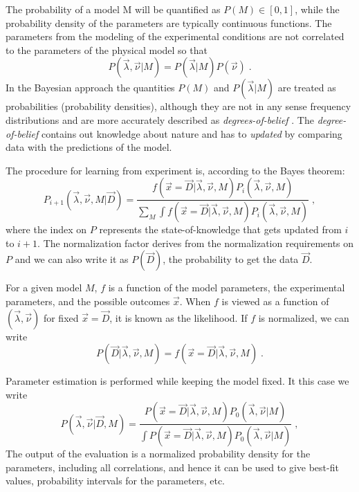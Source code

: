  The probability of a model M will be quantified as $P(M)\in[0,1]$, while the probability density of the parameters are typically continuous functions. The parameters from the modeling of the experimental conditions are not correlated to the parameters of the physical model so that
\[P(\vec{\lambda},\vec{\nu}|M)=P(\vec{\lambda}|M)P(\vec{\nu})\;.\]
In the Bayesian approach the quantities $P(M)$ and $P(\vec{\lambda}|M)$ are treated as probabilities (probability densities), although they are not in any sense frequency distributions and are more accurately described as \emph{degrees-of-belief} \cite{bayesbook}. The \emph{degree-of-belief} contains out knowledge about nature and has to \emph{updated} by comparing data with the predictions of the model.

The procedure for learning from experiment is, according to the Bayes theorem:
\[P_{i+1}(\vec{\lambda},\vec{\nu},M|\vec{D})=\frac{f(\vec{x}=\vec{D}|\vec{\lambda},\vec{\nu},M)P_i(\vec{\lambda},\vec{\nu},M)}{\sum_M\int f(\vec{x}=\vec{D}|\vec{\lambda},\vec{\nu},M)P_i(\vec{\lambda},\vec{\nu},M)}\;,\]
where the index on $P$ represents the state-of-knowledge that gets updated from $i$ to $i+1$. The normalization factor derives from the normalization requirements on $P$ and we can also write it as $P(\vec{D})$, the probability to get the data $\vec{D}$.

For a given model $M$, $f$ is a function of the model parameters, the experimental parameters, and the possible outcomes $\vec{x}$. When $f$ is viewed as a function of $(\vec{\lambda},\vec{\nu})$ for fixed $\vec{x}=\vec{D}$, it is known as the likelihood. If $f$ is normalized, we can write
\[P(\vec{D}|\vec{\lambda},\vec{\nu},M)=f(\vec{x}=\vec{D}|\vec{\lambda},\vec{\nu},M)\;.\]

 Parameter estimation is performed while keeping the model fixed. It this case we write
\begin{equation}P(\vec{\lambda},\vec{\nu}|\vec{D},M)=\frac{P(\vec{x}=\vec{D}|\vec{\lambda},\vec{\nu},M)P_0(\vec{\lambda},\vec{\nu}|M)}{\int P(\vec{x}=\vec{D}|\vec{\lambda},\vec{\nu},M)P_0(\vec{\lambda},\vec{\nu}|M)}\;,\label{eq:posterior}\end{equation}
The output of the evaluation is a normalized probability density for the parameters, including all correlations, and hence it can be used to give best-fit values, probability intervals for the parameters, etc.

